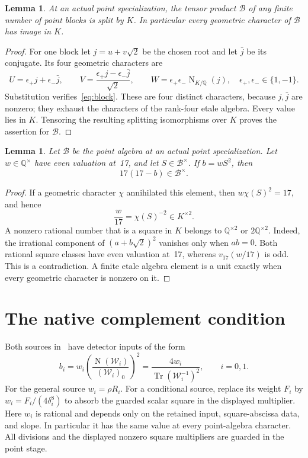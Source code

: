 \documentclass[11pt,a4paper]{article}
\newtheorem{lemma}[theorem]{Lemma}
\theoremstyle{definition}\newtheorem{definition}[theorem]{Definition}
\newcommand{\Q}{\mathbb Q}\newcommand{\Z}{\mathbb Z}
\DeclareMathOperator{\N}{N}\DeclareMathOperator{\Tr}{Tr}
\begin{document}
\begin{lemma}\label{lem:split}
At an actual point specialization, the tensor product $\mathcal B$ of
any finite number of point blocks is split by $K$. In particular every
geometric character of $\mathcal B$ has image in $K$.
\end{lemma}
\begin{proof}
For one block let $j=u+v\sqrt2$ be the chosen root and let $\bar j$ be
its conjugate. Its four geometric characters are
\[
U=\epsilon_+j+\epsilon_-\bar j,\qquad
V=\frac{\epsilon_+j-\epsilon_-\bar j}{\sqrt2},\qquad
W=\epsilon_+\epsilon_-\N_{K/\Q}(j),
\quad \epsilon_+,\epsilon_-\in\{1,-1\}.
\]
Substitution verifies~\eqref{eq:block}. These are four distinct
characters, because $j,\bar j$ are nonzero; they exhaust the
characters of the rank-four etale algebra. Every value lies in $K$.
Tensoring the resulting splitting isomorphisms over $K$ proves the
assertion for $\mathcal B$.
\end{proof}

\begin{lemma}\label{lem:units}
Let $\mathcal B$ be the point algebra at an actual point
specialization. Let $w\in\Q^\times$ have even valuation at~17, and
let $S\in\mathcal B^\times$. If $b=wS^2$, then
\[
                         17(17-b)\in\mathcal B^\times.
\]
\end{lemma}
\begin{proof}
If a geometric character $\chi$ annihilated this element, then
$w\chi(S)^2=17$, and hence
\[
                         \frac w{17}=\chi(S)^{-2}\in K^{\times2}.
\]
A nonzero rational number that is a square in $K$ belongs to
$\Q^{\times2}$ or $2\Q^{\times2}$. Indeed, the irrational component
of $(a+b\sqrt2)^2$ vanishes only when $ab=0$. Both rational square
classes have even valuation at~17, whereas $v_{17}(w/17)$ is odd.
This is a contradiction. A finite etale algebra element is a unit
exactly when every geometric character is nonzero on it.
\end{proof}

\section{The native complement condition}
Both sources in~\cite{Unit} have detector inputs of the form
\begin{equation}\label{eq:detector}
b_i=w_i\left(\frac{\N(\mathcal W_i)}{(\mathcal W_i)_0}\right)^2
    =\frac{4w_i}{\Tr(\mathcal W_i^{-1})^2},\qquad i=0,1.
\end{equation}
For the general source $w_i=\rho R_i$. For a conditional source,
replace its weight $F_i$ by $w_i=F_i/(4\delta_i^8)$ to absorb
the guarded scalar square in the displayed multiplier.
Here $w_i$ is rational and depends only on the retained input,
square-abscissa data, and slope. In particular it has the same value
at every point-algebra character. All divisions and the displayed
nonzero square multipliers are guarded in the point stage.
\end{document}
